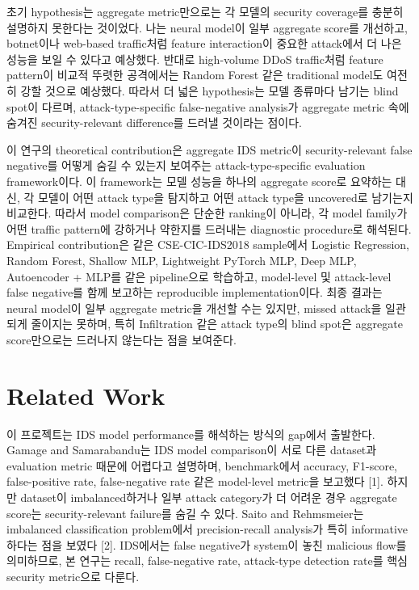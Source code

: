 \documentclass[sigconf,nonacm]{acmart}
\begin{document}
초기 hypothesis는 aggregate metric만으로는 각 모델의 security coverage를 충분히 설명하지 못한다는 것이었다.
나는 neural model이 일부 aggregate score를 개선하고, botnet이나 web-based traffic처럼 feature interaction이 중요한 attack에서 더 나은 성능을 보일 수 있다고 예상했다.
반대로 high-volume DDoS traffic처럼 feature pattern이 비교적 뚜렷한 공격에서는 Random Forest 같은 traditional model도 여전히 강할 것으로 예상했다.
따라서 더 넓은 hypothesis는 모델 종류마다 남기는 blind spot이 다르며, attack-type-specific false-negative analysis가 aggregate metric 속에 숨겨진 security-relevant difference를 드러낼 것이라는 점이다.

이 연구의 theoretical contribution은 aggregate IDS metric이 security-relevant false negative를 어떻게 숨길 수 있는지 보여주는 attack-type-specific evaluation framework이다.
이 framework는 모델 성능을 하나의 aggregate score로 요약하는 대신, 각 모델이 어떤 attack type을 탐지하고 어떤 attack type을 uncovered로 남기는지 비교한다.
따라서 model comparison은 단순한 ranking이 아니라, 각 model family가 어떤 traffic pattern에 강하거나 약한지를 드러내는 diagnostic procedure로 해석된다.
Empirical contribution은 같은 CSE-CIC-IDS2018 sample에서 Logistic Regression, Random Forest, Shallow MLP, Lightweight PyTorch MLP, Deep MLP, Autoencoder + MLP를 같은 pipeline으로 학습하고, model-level 및 attack-level false negative를 함께 보고하는 reproducible implementation이다.
최종 결과는 neural model이 일부 aggregate metric을 개선할 수는 있지만, missed attack을 일관되게 줄이지는 못하며, 특히 Infiltration 같은 attack type의 blind spot은 aggregate score만으로는 드러나지 않는다는 점을 보여준다.

\section{Related Work}

이 프로젝트는 IDS model performance를 해석하는 방식의 gap에서 출발한다.
Gamage and Samarabandu는 IDS model comparison이 서로 다른 dataset과 evaluation metric 때문에 어렵다고 설명하며, benchmark에서 accuracy, F1-score, false-positive rate, false-negative rate 같은 model-level metric을 보고했다 [1].
하지만 dataset이 imbalanced하거나 일부 attack category가 더 어려운 경우 aggregate score는 security-relevant failure를 숨길 수 있다.
Saito and Rehmsmeier는 imbalanced classification problem에서 precision-recall analysis가 특히 informative하다는 점을 보였다 [2].
IDS에서는 false negative가 system이 놓친 malicious flow를 의미하므로, 본 연구는 recall, false-negative rate, attack-type detection rate를 핵심 security metric으로 다룬다.
\end{document}
